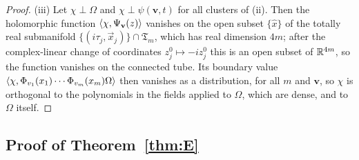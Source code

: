 \begin{proof}
(iii) Let $\chi\perp\Omega$ and $\chi\perp\psi(\mathbf v,t)$ for all clusters
of (ii). Then the
holomorphic function $\langle \chi,\Psi_{\mathbf v}(z)\rangle$ vanishes on the open
subset $\{\hat x\}$ of the totally real submanifold $\{(i\tau_j,\vec x_j)\}
\cap\mathfrak T_m$, which has real dimension $4m$; after the complex-linear
change of coordinates $z^0_j\mapsto-iz^0_j$ this is an open subset of
$\mathbb{R}^{4m}$, so the function vanishes on the connected tube. Its boundary
value $\langle \chi,\Phi_{v_1}(x_1)\cdots\Phi_{v_m}(x_m)\Omega\rangle$ then vanishes as a
distribution, for all $m$ and $\mathbf v$, so $\chi$ is orthogonal to the
polynomials in the fields applied to $\Omega$, which are dense, and to
$\Omega$ itself.
\end{proof}

\subsection{Proof of Theorem~\ref{thm:E}}\label{ssec:assembly}

